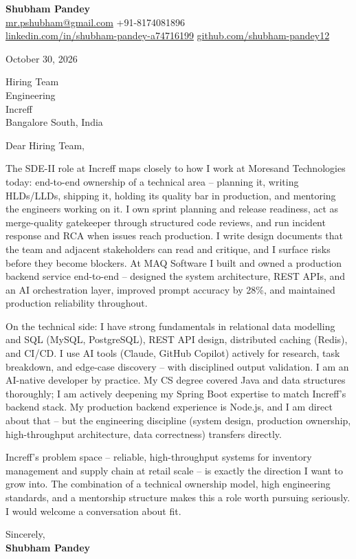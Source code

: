 \documentclass[a4paper,11pt]{article}
\begin{document}
\textbf{\Large Shubham Pandey}\\
\href{mailto:mr.pshubham@gmail.com}{mr.pshubham@gmail.com} \quad +91-8174081896\\
\href{https://www.linkedin.com/in/shubham-pandey-a74716199/}{linkedin.com/in/shubham-pandey-a74716199} \quad
\href{https://github.com/shubham-pandey12}{github.com/shubham-pandey12}

\vspace{1em}
October 30, 2026

\vspace{1em}
Hiring Team\\
Engineering\\
Increff\\
Bangalore South, India

\vspace{1em}
Dear Hiring Team,

The SDE-II role at Increff maps closely to how I work at Moresand Technologies today: end-to-end ownership of a technical area -- planning it, writing HLDs/LLDs, shipping it, holding its quality bar in production, and mentoring the engineers working on it. I own sprint planning and release readiness, act as merge-quality gatekeeper through structured code reviews, and run incident response and RCA when issues reach production. I write design documents that the team and adjacent stakeholders can read and critique, and I surface risks before they become blockers. At MAQ Software I built and owned a production backend service end-to-end -- designed the system architecture, REST APIs, and an AI orchestration layer, improved prompt accuracy by 28\%, and maintained production reliability throughout.

On the technical side: I have strong fundamentals in relational data modelling and SQL (MySQL, PostgreSQL), REST API design, distributed caching (Redis), and CI/CD. I use AI tools (Claude, GitHub Copilot) actively for research, task breakdown, and edge-case discovery -- with disciplined output validation. I am an AI-native developer by practice. My CS degree covered Java and data structures thoroughly; I am actively deepening my Spring Boot expertise to match Increff's backend stack. My production backend experience is Node.js, and I am direct about that -- but the engineering discipline (system design, production ownership, high-throughput architecture, data correctness) transfers directly.

Increff's problem space -- reliable, high-throughput systems for inventory management and supply chain at retail scale -- is exactly the direction I want to grow into. The combination of a technical ownership model, high engineering standards, and a mentorship structure makes this a role worth pursuing seriously. I would welcome a conversation about fit.

\vspace{1em}
Sincerely,\\[0.5em]
\textbf{Shubham Pandey}
\end{document}
